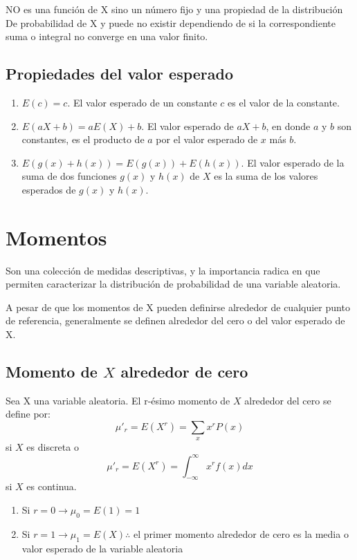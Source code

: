 \documentclass{book}
\begin{document}
NO es una función de X sino un número fijo y una propiedad de la distribución De probabilidad de X y puede no existir dependiendo de si la correspondiente suma o integral no converge en una valor finito. 

\subsection{Propiedades del valor esperado}
\begin{enumerate}
    \item $E(c) = c$. El valor esperado de un constante $c$ es el valor de la constante.
    \item $E(aX+b)=aE(X)+b$. El valor esperado de $aX + b$, en donde $a$ y $b$ son constantes, es el producto de $a$ por el valor esperado de $x$ más $b$. 
    \item  $E(g(x)+h(x)) = E(g(x)) + E(h(x))$. El valor esperado de la suma de dos funciones $g(x)$ y $h(x)$ de $X$ es la suma de los valores esperados de $g(x)$ y $h(x)$.
\end{enumerate}


\section{Momentos} Son una colección de medidas descriptivas, y la importancia radica en que permiten caracterizar la distribución de probabilidad de una variable aleatoria.

A pesar de que los momentos de X pueden definirse alrededor de cualquier punto de referencia, generalmente se definen alrededor del cero o del valor esperado de X. 
 
\subsection{Momento de $X$ alrededor de cero} 
Sea X una variable aleatoria. El r-ésimo momento de $X$ alrededor del cero se define por:
$$\mu'_r = E(X^r)=\underset{x}{\sum}x^rP(x)$$ si $X$ es discreta o $$\mu'_r=E(X^r)=\int_{-\infty}^{\infty}x^rf(x) dx$$ si $X$ es continua.


\begin{enumerate}
    \item Si $r=0 \rightarrow \mu_0= E(1) = 1$
    \item Si $r=1 \rightarrow \mu_1= E(X) \therefore $ el primer momento alrededor de cero es la media o valor esperado de la variable aleatoria
\end{enumerate}
\end{document}
